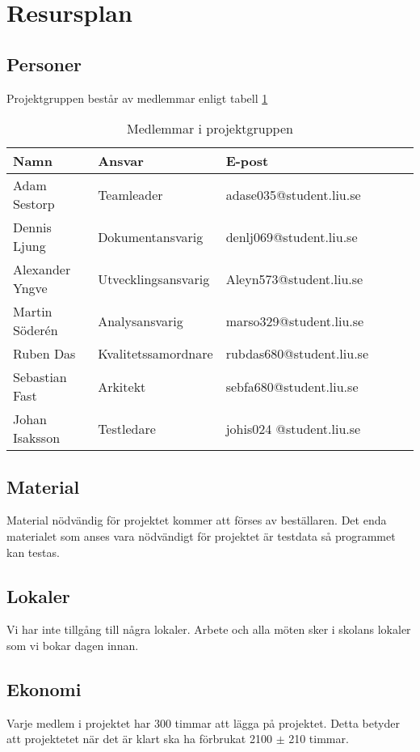 \section{Resursplan}

\subsection{Personer}
Projektgruppen består av medlemmar enligt tabell \ref{projektplan:resursplan-personer}
\begin{table}[h]
	\centering
		\begin{tabularx}{\textwidth}{| l | l | X | l | l | l |}
			\hline
			\textbf{Namn} & \textbf{Ansvar} & \textbf{E-post} \\
			\hline
			{Adam Sestorp} & {Teamleader} & {adase035@student.liu.se} \\\hline
			{Dennis Ljung} & {Dokumentansvarig} & {denlj069@student.liu.se} \\\hline
			{Alexander Yngve} & {Utvecklingsansvarig} & {Aleyn573@student.liu.se} \\\hline
			{Martin Söderén} & {Analysansvarig} & {marso329@student.liu.se} \\\hline
			{Ruben Das} & {Kvalitetssamordnare} & {rubdas680@student.liu.se} \\\hline
			{Sebastian Fast} & {Arkitekt} & {sebfa680@student.liu.se} \\\hline
			{Johan Isaksson } & {Testledare} & {johis024	@student.liu.se} \\\hline
		\end{tabularx}
	\caption{Medlemmar i projektgruppen} \label{projektplan:resursplan-personer}
\end{table}

\subsection{Material}
Material nödvändig för projektet kommer att förses av beställaren. Det enda materialet som anses vara nödvändigt för projektet är testdata så programmet kan testas.

\subsection{Lokaler}
Vi har inte tillgång till några lokaler. Arbete och alla möten sker i skolans lokaler som vi bokar dagen innan. 

\subsection{Ekonomi}
Varje medlem i projektet har 300 timmar att lägga på projektet. Detta betyder att projektetet när det är klart ska ha förbrukat 2100 $\pm $ 210 timmar.